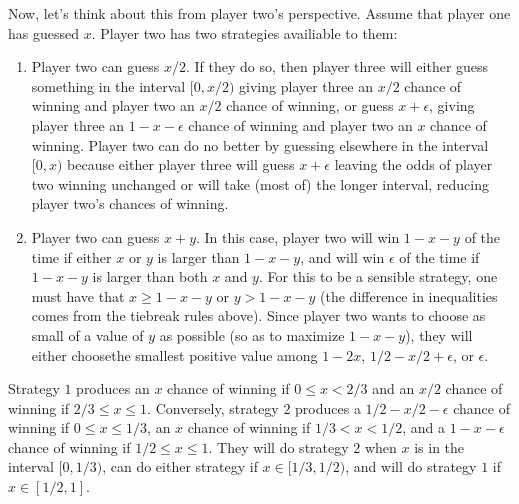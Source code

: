 \documentclass[11pt]{article}
\theoremstyle{definition}
\begin{document}
Now, let's think about this from player two's perspective.  Assume that player one has guessed $x$.  Player two has two strategies availiable to them:
\begin{enumerate}
\item Player two can guess $x/2$.  If they do so, then player three will either guess something in the interval $[0, x/2)$ giving player three an $x/2$ chance of winning and player two an $x/2$ chance of winning, or guess $x + \epsilon$, giving player three an $1-x-\epsilon$ chance of winning and player two an $x$ chance of winning.  Player two can do no better by guessing elsewhere in the interval $[0, x)$ because either player three will guess $x+\epsilon$ leaving the odds of player two winning unchanged or will take (most of) the longer interval, reducing player two's chances of winning.
\item Player two can guess $x + y$.  In this case, player two will win $1-x-y$ of the time if either $x$ or $y$ is larger than $1-x-y$, and will win $\epsilon$ of the time if $1-x-y$ is larger than both $x$ and $y$.  For this to be a sensible strategy, one must have that $x\geq1-x-y$ or $y>1-x-y$ (the difference in inequalities comes from the tiebreak rules above).  Since player two wants to choose as small of a value of $y$ as possible (so as to maximize $1-x-y$), they will either choosethe smallest positive value among $1-2x$, $1/2-x/2+\epsilon$, or $\epsilon$.
\end{enumerate}
Strategy $1$ produces an $x$ chance of winning if $0\leq x < 2/3$ and an $x/2$ chance of winning if $2/3\leq x \leq 1$.  Conversely, strategy $2$ produces a $1/2 - x/2 - \epsilon$ chance of winning if $0 \leq x \leq 1/3$, an $x$ chance of winning if $1/3<x<1/2$, and a $1-x-\epsilon$ chance of winning if $1/2 \leq x \leq 1$.  They will do strategy $2$ when $x$ is in the interval $[0, 1/3)$, can do either strategy if $x \in [1/3, 1/2)$, and will do strategy $1$ if $x \in [1/2, 1]$.
\end{document}
